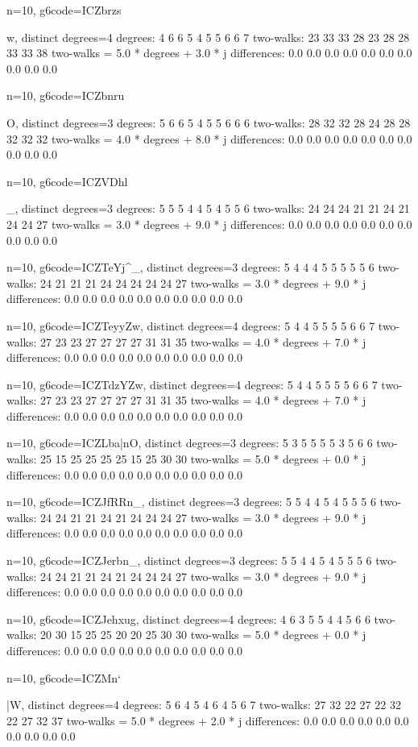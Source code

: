 {{{{{{{{{{{{n=10, g6code=ICZbrzs{w, distinct degrees=4
degrees: 4 6 6 5 4 5 5 6 6 7 
two-walks: 23 33 33 28 23 28 28 33 33 38 
two-walks = 5.0 * degrees + 3.0 * j
differences: 0.0 0.0 0.0 0.0 0.0 0.0 0.0 0.0 0.0 0.0 

n=10, g6code=ICZbnru}O, distinct degrees=3
degrees: 5 6 6 5 4 5 5 6 6 6 
two-walks: 28 32 32 28 24 28 28 32 32 32 
two-walks = 4.0 * degrees + 8.0 * j
differences: 0.0 0.0 0.0 0.0 0.0 0.0 0.0 0.0 0.0 0.0 

n=10, g6code=ICZVDhl}_, distinct degrees=3
degrees: 5 5 5 4 4 5 4 5 5 6 
two-walks: 24 24 24 21 21 24 21 24 24 27 
two-walks = 3.0 * degrees + 9.0 * j
differences: 0.0 0.0 0.0 0.0 0.0 0.0 0.0 0.0 0.0 0.0 

n=10, g6code=ICZTeYj^_, distinct degrees=3
degrees: 5 4 4 4 5 5 5 5 5 6 
two-walks: 24 21 21 21 24 24 24 24 24 27 
two-walks = 3.0 * degrees + 9.0 * j
differences: 0.0 0.0 0.0 0.0 0.0 0.0 0.0 0.0 0.0 0.0 

n=10, g6code=ICZTeyyZw, distinct degrees=4
degrees: 5 4 4 5 5 5 5 6 6 7 
two-walks: 27 23 23 27 27 27 27 31 31 35 
two-walks = 4.0 * degrees + 7.0 * j
differences: 0.0 0.0 0.0 0.0 0.0 0.0 0.0 0.0 0.0 0.0 

n=10, g6code=ICZTdzYZw, distinct degrees=4
degrees: 5 4 4 5 5 5 5 6 6 7 
two-walks: 27 23 23 27 27 27 27 31 31 35 
two-walks = 4.0 * degrees + 7.0 * j
differences: 0.0 0.0 0.0 0.0 0.0 0.0 0.0 0.0 0.0 0.0 

n=10, g6code=ICZLba|nO, distinct degrees=3
degrees: 5 3 5 5 5 5 3 5 6 6 
two-walks: 25 15 25 25 25 25 15 25 30 30 
two-walks = 5.0 * degrees + 0.0 * j
differences: 0.0 0.0 0.0 0.0 0.0 0.0 0.0 0.0 0.0 0.0 

n=10, g6code=ICZJfRRn_, distinct degrees=3
degrees: 5 5 4 4 5 4 5 5 5 6 
two-walks: 24 24 21 21 24 21 24 24 24 27 
two-walks = 3.0 * degrees + 9.0 * j
differences: 0.0 0.0 0.0 0.0 0.0 0.0 0.0 0.0 0.0 0.0 

n=10, g6code=ICZJerbn_, distinct degrees=3
degrees: 5 5 4 4 5 4 5 5 5 6 
two-walks: 24 24 21 21 24 21 24 24 24 27 
two-walks = 3.0 * degrees + 9.0 * j
differences: 0.0 0.0 0.0 0.0 0.0 0.0 0.0 0.0 0.0 0.0 

n=10, g6code=ICZJehxug, distinct degrees=4
degrees: 4 6 3 5 5 4 4 5 6 6 
two-walks: 20 30 15 25 25 20 20 25 30 30 
two-walks = 5.0 * degrees + 0.0 * j
differences: 0.0 0.0 0.0 0.0 0.0 0.0 0.0 0.0 0.0 0.0 

n=10, g6code=ICZMn`{|W, distinct degrees=4
degrees: 5 6 4 5 4 6 4 5 6 7 
two-walks: 27 32 22 27 22 32 22 27 32 37 
two-walks = 5.0 * degrees + 2.0 * j
differences: 0.0 0.0 0.0 0.0 0.0 0.0 0.0 0.0 0.0 0.0 

}}}}}}}}}}}}
